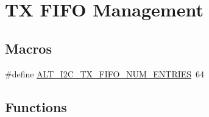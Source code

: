 \hypertarget{group__ALT__I2C__TX__FIFO}{}\section{TX F\+I\+FO Management}
\label{group__ALT__I2C__TX__FIFO}
\subsection*{Macros}
\begin{DoxyCompactItemize}
\item 
\#define \mbox{\hyperlink{group__ALT__I2C__TX__FIFO_ga8fdcef1d93529a30efd59075f699ad95}{A\+L\+T\+\_\+\+I2\+C\+\_\+\+T\+X\+\_\+\+F\+I\+F\+O\+\_\+\+N\+U\+M\+\_\+\+E\+N\+T\+R\+I\+ES}}~64
\end{DoxyCompactItemize}
\subsection*{Functions}
